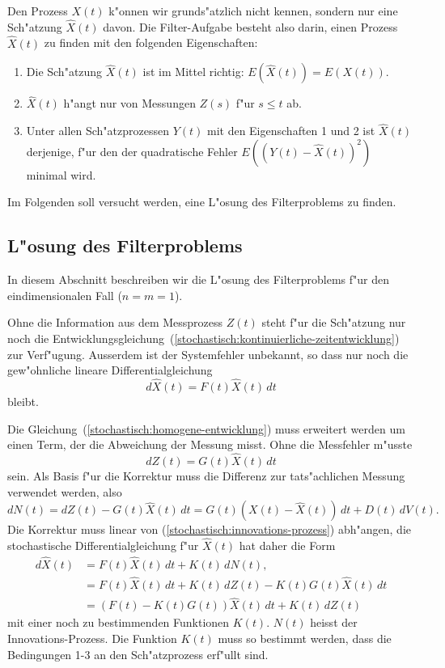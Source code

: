 Den Prozess $X(t)$ k"onnen wir grunds"atzlich nicht kennen, sondern
nur eine Sch"atzung $\hat X(t)$ davon.
Die Filter-Aufgabe besteht also darin, einen Prozess $\hat X(t)$ zu
finden mit den folgenden Eigenschaften:
\begin{enumerate}
\item
Die Sch"atzung $\hat X(t)$ ist im Mittel richtig:
$E(\hat X(t)) = E(X(t))$.
\item
$\hat X(t)$ h"angt nur von Messungen $Z(s)$ f"ur $s\le t$ ab.
\item
Unter allen Sch"atzprozessen $Y(t)$ mit den Eigenschaften 1 und 2 ist
$\hat X(t)$ derjenige, f"ur den der quadratische Fehler 
$E((Y(t)-\hat X(t))^2)$  minimal wird.
\end{enumerate}
Im Folgenden soll versucht werden, eine L"osung des Filterproblems zu
finden.

%
%
\subsection{L"osung des Filterproblems\label{stochastisch:loesung-filterproblem}}
In diesem Abschnitt beschreiben wir die L"osung des Filterproblems
f"ur den eindimensionalen Fall ($n=m=1$).

Ohne die Information aus dem Messprozess $Z(t)$ steht f"ur die 
Sch"atzung nur noch die
Entwicklungsgleichung~(\ref{stochastisch:kontinuierliche-zeitentwicklung})
zur Verf"ugung.
Ausserdem ist der Systemfehler unbekannt, so dass nur noch die gew"ohnliche
lineare Differentialgleichung
\begin{equation}
d\hat X(t) = F(t)\hat X(t)\,dt
\label{stochastisch:homogene-entwicklung}
\end{equation}
bleibt.

Die Gleichung~(\ref{stochastisch:homogene-entwicklung}) muss erweitert
werden um einen Term, der die Abweichung der Messung misst.
Ohne die Messfehler m"usste
\[
dZ(t) = G(t)\hat X(t)\,dt
\]
sein.
Als Basis f"ur die Korrektur muss die Differenz zur tats"achlichen
Messung verwendet werden, also
\begin{equation}
dN(t)
=
dZ(t) - G(t)\hat X(t)\,dt
=
G(t)(X(t)-\hat X(t))\,dt + D(t)\,dV(t)
.
\label{stochastisch:innovations-prozess}
\end{equation}
Die Korrektur muss linear von (\ref{stochastisch:innovations-prozess})
abh"angen, die stochastische Differentialgleichung f"ur $\hat X(t)$
hat daher die Form
\begin{align*}
d\hat X(t)
&=
F(t)\hat X(t)\,dt + K(t)\,dN(t),
\\
&=
F(t)\hat X(t)\,dt
+
K(t)\,dZ(t) - K(t)G(t)\hat X(t)\,dt
\\
&=
(F(t)-K(t)G(t))\hat X(t)\,dt
+
K(t)\,dZ(t)
\end{align*}
mit einer noch zu bestimmenden Funktionen $K(t)$.
$N(t)$ heisst der Innovations-Prozess.
Die Funktion $K(t)$ muss so bestimmt werden, dass die Bedingungen
1-3 an den Sch"atzprozess erf"ullt sind.

